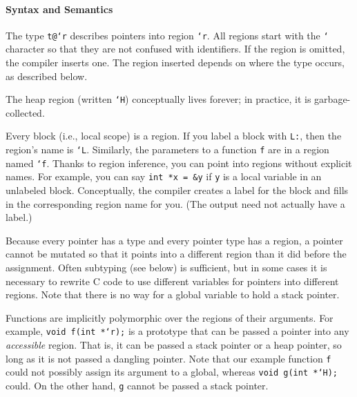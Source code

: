 \paragraph{Syntax and Semantics} The type \texttt{t@`r}
describes pointers into region \texttt{`r}.  All regions start with the
\texttt{`} character so that they are not confused with identifiers.  If
the region is omitted, the compiler inserts one.  The region inserted
depends on where the type occurs, as described below.

The heap region (written \texttt{`H}) conceptually lives forever; in
practice, it is garbage-collected.

Every block (i.e., local scope) is a region.  If you label a block
with \texttt{L:}, then the region's name is \texttt{`L}.  Similarly, the
parameters to a function \texttt{f} are in a region named \texttt{`f}.
Thanks to region inference, you can point into regions without explicit
names.  For example, you can say \texttt{int *x = \&y} if \texttt{y} is a
local variable in an unlabeled block.  Conceptually, the compiler
creates a label for the block and fills in the corresponding region
name for you.  (The output need not actually have a label.)

Because every pointer has a type and every pointer type has a region,
a pointer cannot be mutated so that it points into a different region
than it did before the assignment.  Often subtyping (see below) is
sufficient, but in some cases it is necessary to rewrite C code to use
different variables for pointers into different regions.  Note that
there is no way for a global variable to hold a stack pointer.

Functions are implicitly polymorphic over the regions of their
arguments.  For example, \texttt{void f(int *`r);} is a prototype that
can be passed a pointer into any \emph{accessible} region.  That is,
it can be passed a stack pointer or a heap pointer, so long as it is
not passed a dangling pointer.  
Note that our example function \texttt{f} could not possibly assign its
argument to a global, whereas \texttt{void g(int *`H);} could.  On the
other hand, \texttt{g} cannot be passed a stack pointer.

